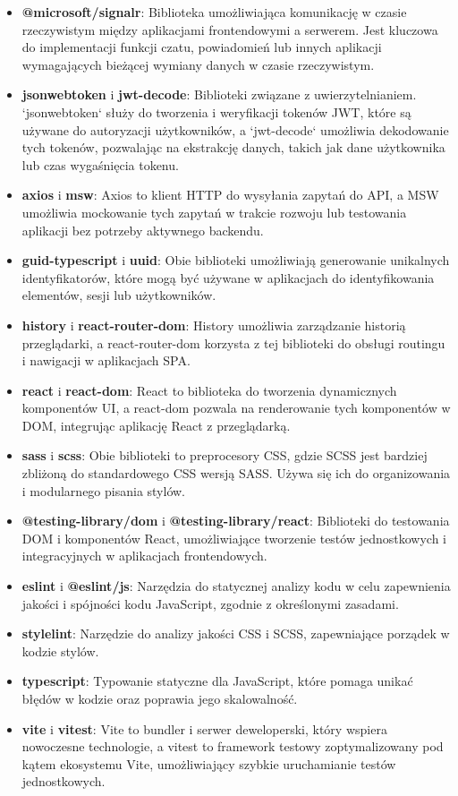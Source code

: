 \documentclass[12pt,a4paper]{article}
\begin{document}
\begin{itemize} 
    \item \textbf{@microsoft/signalr}: Biblioteka umożliwiająca komunikację w czasie rzeczywistym między aplikacjami frontendowymi a serwerem. Jest kluczowa do implementacji funkcji czatu, powiadomień lub innych aplikacji wymagających bieżącej wymiany danych w czasie rzeczywistym.
    \item \textbf{jsonwebtoken} i \textbf{jwt-decode}: Biblioteki związane z uwierzytelnianiem. `jsonwebtoken` służy do tworzenia i weryfikacji tokenów JWT, które są używane do autoryzacji użytkowników, a `jwt-decode` umożliwia dekodowanie tych tokenów, pozwalając na ekstrakcję danych, takich jak dane użytkownika lub czas wygaśnięcia tokenu.
    \item \textbf{axios} i \textbf{msw}: Axios to klient HTTP do wysyłania zapytań do API, a MSW umożliwia mockowanie tych zapytań w trakcie rozwoju lub testowania aplikacji bez potrzeby aktywnego backendu. 
    \item \textbf{guid-typescript} i \textbf{uuid}: Obie biblioteki umożliwiają generowanie unikalnych identyfikatorów, które mogą być używane w aplikacjach do identyfikowania elementów, sesji lub użytkowników. 
    \item \textbf{history} i \textbf{react-router-dom}: History umożliwia zarządzanie historią przeglądarki, a react-router-dom korzysta z tej biblioteki do obsługi routingu i nawigacji w aplikacjach SPA. 
    \item \textbf{react} i \textbf{react-dom}: React to biblioteka do tworzenia dynamicznych komponentów UI, a react-dom pozwala na renderowanie tych komponentów w DOM, integrując aplikację React z przeglądarką. 
    \item \textbf{sass} i \textbf{scss}: Obie biblioteki to preprocesory CSS, gdzie SCSS jest bardziej zbliżoną do standardowego CSS wersją SASS. Używa się ich do organizowania i modularnego pisania stylów. 
    \item \textbf{@testing-library/dom} i \textbf{@testing-library/react}: Biblioteki do testowania DOM i komponentów React, umożliwiające tworzenie testów jednostkowych i integracyjnych w aplikacjach frontendowych. 
    \item \textbf{eslint} i \textbf{@eslint/js}: Narzędzia do statycznej analizy kodu w celu zapewnienia jakości i spójności kodu JavaScript, zgodnie z określonymi zasadami. 
    \item \textbf{stylelint}: Narzędzie do analizy jakości CSS i SCSS, zapewniające porządek w kodzie stylów. 
    \item \textbf{typescript}: Typowanie statyczne dla JavaScript, które pomaga unikać błędów w kodzie oraz poprawia jego skalowalność.
    \item \textbf{vite} i \textbf{vitest}: Vite to bundler i serwer deweloperski, który wspiera nowoczesne technologie, a vitest to framework testowy zoptymalizowany pod kątem ekosystemu Vite, umożliwiający szybkie uruchamianie testów jednostkowych. 
\end{itemize}
\end{document}
